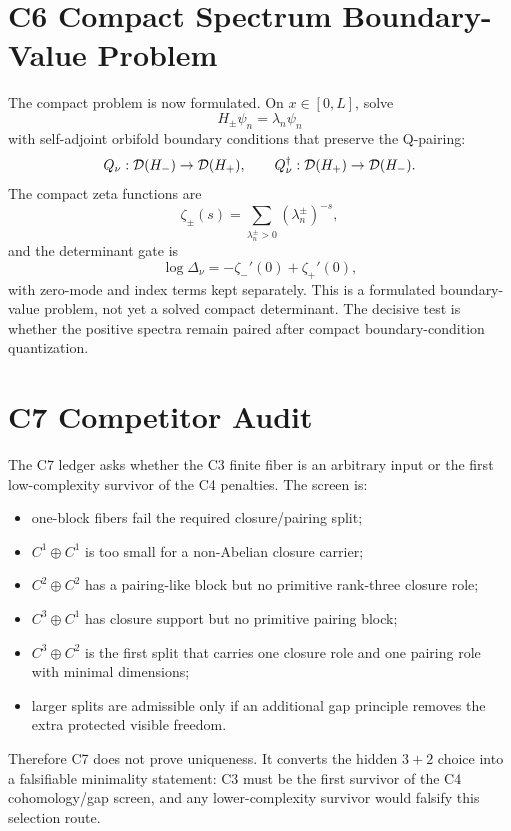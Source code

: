 \documentclass[11pt]{article}
\begin{document}
\section{C6 Compact Spectrum Boundary-Value Problem}
The compact problem is now formulated.  On $x\in[0,L]$, solve
\begin{equation}
H_\pm\psi_n=\lambda_n\psi_n
\end{equation}
with self-adjoint orbifold boundary conditions that preserve the Q-pairing:
\begin{equation}
Q_\nu:{\cal D}(H_-)\to{\cal D}(H_+),
\qquad
Q_\nu^\dagger:{\cal D}(H_+)\to{\cal D}(H_-).
\end{equation}
The compact zeta functions are
\begin{equation}
\zeta_\pm(s)=\sum_{\lambda_n^\pm>0}(\lambda_n^\pm)^{-s},
\end{equation}
and the determinant gate is
\begin{equation}
\log\Delta_\nu=-\zeta_-'(0)+\zeta_+'(0),
\end{equation}
with zero-mode and index terms kept separately.  This is a formulated
boundary-value problem, not yet a solved compact determinant.  The decisive
test is whether the positive spectra remain paired after compact
boundary-condition quantization.

\section{C7 Competitor Audit}
The C7 ledger asks whether the C3 finite fiber is an arbitrary input or the
first low-complexity survivor of the C4 penalties.  The screen is:
\begin{itemize}
\item one-block fibers fail the required closure/pairing split;
\item $C^1\oplus C^1$ is too small for a non-Abelian closure carrier;
\item $C^2\oplus C^2$ has a pairing-like block but no primitive rank-three closure role;
\item $C^3\oplus C^1$ has closure support but no primitive pairing block;
\item $C^3\oplus C^2$ is the first split that carries one closure role and one pairing role with minimal dimensions;
\item larger splits are admissible only if an additional gap principle removes the extra protected visible freedom.
\end{itemize}
Therefore C7 does not prove uniqueness.  It converts the hidden $3+2$ choice
into a falsifiable minimality statement: C3 must be the first survivor of the
C4 cohomology/gap screen, and any lower-complexity survivor would falsify this
selection route.
\end{document}
